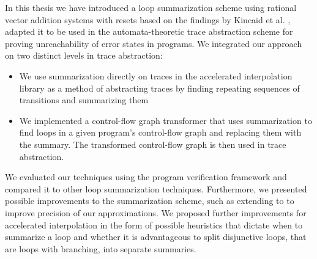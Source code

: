 
\begin{comment}
	\jw{What have we done in this project? What have we learned? What can there still be done to boost performance/fix errors/etc \\
	Give an outlook on the future \\
	\vspace{1cm} 
	2 pages}
\end{comment}

In this thesis we have introduced a loop summarization scheme using rational vector addition systems with resets based on the findings by Kincaid et al. \cite{DBLP:conf/cav/SilvermanK19}, adapted it to be used in the automata-theoretic trace abstraction scheme \cite{10.1007/978-3-642-03237-0_7, 10.1007/978-3-642-39799-8_2, 10.1145/1706299.1706353} for proving unreachability of error states in programs. We integrated our \qvasr approach on two distinct levels in trace abstraction:
\begin{itemize}
	\item We use \qvasr summarization directly on traces in the accelerated interpolation library as a method of abstracting traces by finding repeating sequences of transitions and summarizing them
	\item We implemented a control-flow graph transformer that uses \qvasr summarization to find loops in a given program's control-flow graph and replacing them with the summary. The transformed control-flow graph is then used in trace abstraction. 
\end{itemize} 
We evaluated our techniques using the program verification framework \ultimate \cite{Zitat02} and compared it to other loop summarization techniques. 
Furthermore, we presented possible improvements to the \qvasr summarization scheme, such as extending \qvasr to \qvasrs to improve precision of our approximations. We proposed further improvements for accelerated interpolation in the form of possible heuristics that dictate when to summarize a loop and whether it is advantageous to split disjunctive loops, that are loops with branching, into separate summaries.